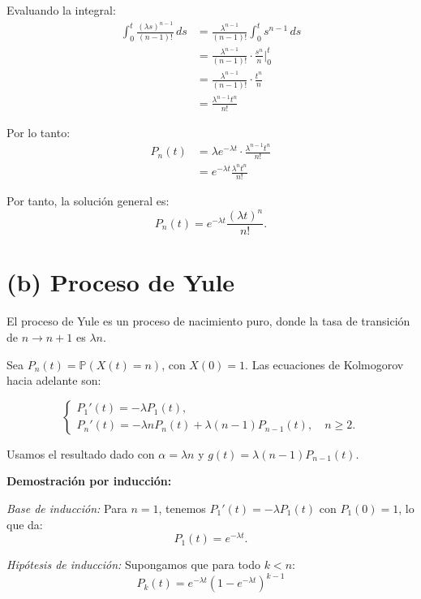 \documentclass[10pt]{article}
\begin{document}
Evaluando la integral:
\begin{align*}
\int_0^t \frac{(\lambda s)^{n-1}}{(n-1)!} \, ds &= \frac{\lambda^{n-1}}{(n-1)!} \int_0^t s^{n-1} \, ds \\
&= \frac{\lambda^{n-1}}{(n-1)!} \cdot \frac{s^n}{n}\Big|_0^t \\
&= \frac{\lambda^{n-1}}{(n-1)!} \cdot \frac{t^n}{n} \\
&= \frac{\lambda^{n-1} t^n}{n!}
\end{align*}

Por lo tanto:
\begin{align*}
P_n(t) &= \lambda e^{-\lambda t} \cdot \frac{\lambda^{n-1} t^n}{n!} \\
&= e^{-\lambda t} \frac{\lambda^n t^n}{n!}
\end{align*}

Por tanto, la solución general es:
\begin{equation*}
\boxed{P_n(t) = e^{-\lambda t} \frac{(\lambda t)^n}{n!}}.
\end{equation*}

\vspace{0.5cm}
\section*{(b) Proceso de Yule}

El proceso de Yule es un proceso de nacimiento puro, donde la tasa de transición de $n \to n+1$ es $\lambda n$.

Sea $P_n(t) = \mathbb{P}(X(t) = n)$, con $X(0) = 1$. Las ecuaciones de Kolmogorov hacia adelante son:

\begin{equation*}
\begin{cases}
P_1'(t) = -\lambda P_1(t), \\
P_n'(t) = -\lambda n P_n(t) + \lambda (n-1) P_{n-1}(t), \quad n \geq 2.
\end{cases}
\end{equation*}

Usamos el resultado dado con $\alpha = \lambda n$ y $g(t) = \lambda(n-1)P_{n-1}(t)$.

\textbf{Demostración por inducción:}

\textit{Base de inducción:} Para $n=1$, tenemos $P_1'(t) = -\lambda P_1(t)$ con $P_1(0) = 1$, lo que da:
\begin{equation*}
P_1(t) = e^{-\lambda t}.
\end{equation*}

\textit{Hipótesis de inducción:} Supongamos que para todo $k < n$:
\begin{equation*}
P_k(t) = e^{-\lambda t} (1 - e^{-\lambda t})^{k-1}
\end{equation*}
\end{document}
